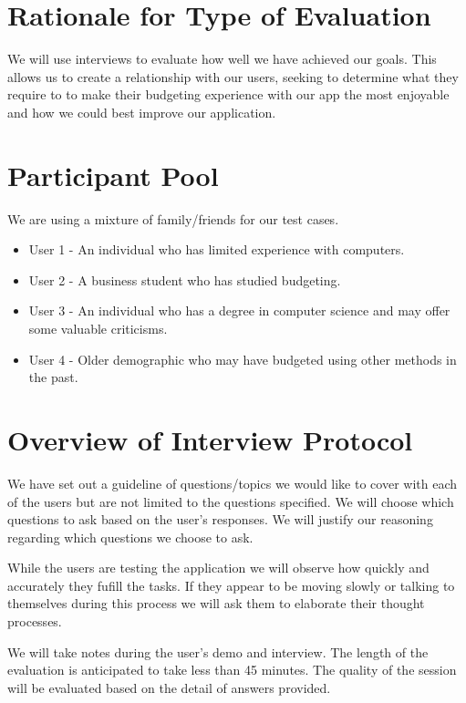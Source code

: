 \documentclass{chi2011}
\begin{document}
\section{Rationale for Type of Evaluation}

We will use interviews to evaluate how well we have achieved our goals. This
allows us to create a relationship with our users, seeking to determine what
they require to to make their budgeting experience with our app the most
enjoyable and how we could best improve our application.

\section{Participant Pool}
We are using a mixture of family/friends for our test cases. 
\begin{itemize}
    \item User 1 - An individual who has limited experience with computers. 
	\item User 2 - A business student who has studied budgeting. 
	\item User 3 - An individual who has a degree in computer science and may offer some valuable criticisms. 
    \item User 4 - Older demographic who may have budgeted using other methods in the past.
\end{itemize}

\section{Overview of Interview Protocol}

We have set out a guideline of questions/topics we would like to cover with
each of the users but are not limited to the questions specified. We will
choose which questions to ask based on the user's responses. We will justify our
reasoning regarding which questions we choose to ask.

While the users are testing the application we will observe how quickly and
accurately they fufill the tasks. If they appear to be moving slowly or talking
to themselves during this process we will ask them to elaborate their thought
processes.

We will take notes during the user's demo and interview. The length of the
evaluation is anticipated to take less than 45 minutes. The quality of
the session will be evaluated based on the detail of answers provided.
\end{document}
